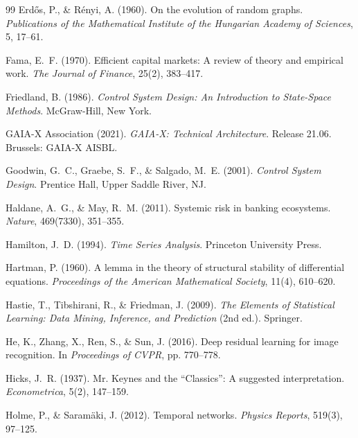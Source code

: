 \documentclass[a4paper, 12pt, twoside, openright]{report}
\theoremstyle{definition}
\theoremstyle{definition}
\begin{document}
\begin{thebibliography}{99}
Erd{\H{o}}s, P., \& R{\'e}nyi, A. (1960).
\newblock On the evolution of random graphs.
\newblock \emph{Publications of the Mathematical Institute of the Hungarian Academy of Sciences}, 5, 17--61.

Fama, E.~F. (1970).
\newblock Efficient capital markets: A review of theory and empirical work.
\newblock \emph{The Journal of Finance}, 25(2), 383--417.

Friedland, B. (1986).
\newblock \emph{Control System Design: An Introduction to State-Space Methods}.
\newblock McGraw-Hill, New York.

GAIA-X Association (2021).
\newblock \emph{GAIA-X: Technical Architecture}.
\newblock Release 21.06. Brussels: GAIA-X AISBL.

Goodwin, G.~C., Graebe, S.~F., \& Salgado, M.~E. (2001).
\newblock \emph{Control System Design}.
\newblock Prentice Hall, Upper Saddle River, NJ.

Haldane, A.~G., \& May, R.~M. (2011).
\newblock Systemic risk in banking ecosystems.
\newblock \emph{Nature}, 469(7330), 351--355.

Hamilton, J.~D. (1994).
\newblock \emph{Time Series Analysis}.
\newblock Princeton University Press.

Hartman, P. (1960).
\newblock A lemma in the theory of structural stability of differential equations.
\newblock \emph{Proceedings of the American Mathematical Society}, 11(4), 610--620.

Hastie, T., Tibshirani, R., \& Friedman, J. (2009).
\newblock \emph{The Elements of Statistical Learning: Data Mining, Inference, and Prediction} (2nd ed.).
\newblock Springer.

He, K., Zhang, X., Ren, S., \& Sun, J. (2016).
\newblock Deep residual learning for image recognition.
\newblock In \emph{Proceedings of CVPR}, pp. 770--778.

Hicks, J.~R. (1937).
\newblock Mr. Keynes and the ``Classics'': A suggested interpretation.
\newblock \emph{Econometrica}, 5(2), 147--159.

Holme, P., \& Saram{\"a}ki, J. (2012).
\newblock Temporal networks.
\newblock \emph{Physics Reports}, 519(3), 97--125.


\end{thebibliography}
\end{document}
